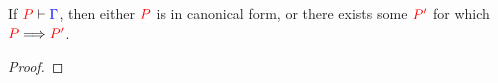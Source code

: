\begin{theorem}[Progress]\label{thm:nc-progress}
  If $\seq[{ P }]{ \Gamma }$,
  then either $\tm{P}$ is in canonical form,
  or there exists some $\tm{P'}$ for which $\reducesto{P}{P'}$.
\end{theorem}
\begin{proof}
\end{proof}
